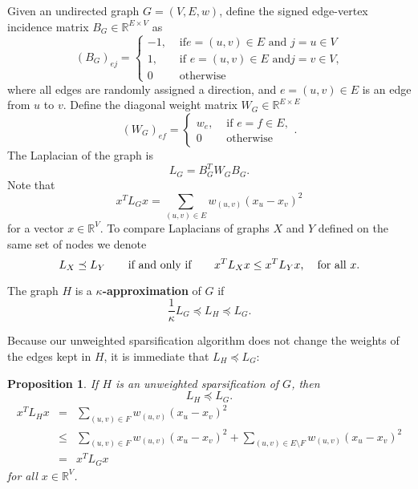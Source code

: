 \documentclass[final,leqno,onefignum,onetabnum]{siamltex1213}
\newtheorem{prop}[theorem]{Proposition}
\begin{document}
Given an undirected graph $G= \left( V, E, w \right)$, define the signed edge-vertex incidence matrix $B_G \in \mathbb{R}^{E \times V }$ as
\[ \left( B_G \right)_{ej} = \left\{ \begin{array}{ll} -1, & \text{ if
$e = (u,v) \in E$ and $j=u\in V$} \\ 1, & \text{ if $e=(u,v)\in E$ and
$j=v\in V$,} \\ 0 & \text{ otherwise} \end{array} \right. \]
where all edges are randomly assigned a direction, and $e = \left( u, v \right) \in E$ is an edge from $u$ to $v$.  Define the diagonal weight matrix $W_G \in \mathbb{R}^{E \times E}$
\[ \left(W_G \right)_{ef} = \left\{ \begin{array}{ll} w_e, &
\text{ if $e=f\in E$}, \\ 0 & \text{ otherwise} \end{array}. \right.
\]
The Laplacian of the graph is
\[ L_G = B_G^T W_G B_G .\]
Note that 
\[ x^T L_G x = \sum_{(u,v) \in E} w_{(u,v)} \left( x_u - x_v
\right)^2 \]
for a vector $x \in \mathbb{R}^{ V }$.  To compare Laplacians of graphs $X$ and $Y$ defined
on the same set of nodes we denote
\[L_X \preceq L_Y \hspace{0.6cm} \text{ if and only if } \hspace{0.6cm}  x^T L_X x \leq x^T L_Y x \text{, } \hspace{0.2cm} \text{ for all } x. \]
\begin{definition} 
The graph $H$ is a {\bf $\kappa$-approximation} of $G$ if
\[ \frac{1}{\kappa} L_G \preceq L_H \preceq L_G. \]
\end{definition}
Because our unweighted sparsification algorithm does not change the weights of
the edges kept in $H$, it is immediate that $L_H \preceq L_G$:
\begin{prop} \label{prop:upp}
If $H$ is an unweighted sparsification of $G$, then
\[L_H \preceq L_G. \]
\proof
\begin{eqnarray}
x^T L_H x &=& \sum_{(u,v) \in F} w_{(u,v)} \left( x_u - x_v\right)^2\nonumber\\
&\leq& \sum_{(u,v) \in F} w_{(u,v)} \left( x_u - x_v\right)^2 + \sum_{(u,v) \in E \setminus F} w_{(u,v)} \left( x_u -
x_v \right)^2\nonumber\\
&=&x^T L_G x\nonumber
\end{eqnarray}
for all $x \in \mathbb{R}^{V}$.
\hspace{2 em}\endproof
\end{prop}
\end{document}
